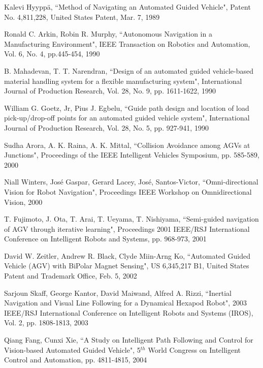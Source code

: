 \begin{thebibliography}{}
\small

 Kalevi Hyypp\"{a}, ``Method of Navigating an Automated Guided Vehicle", Patent No. 4,811,228, United States Patent, Mar. 7, 1989

 Ronald C. Arkin, Robin R. Murphy, ``Autonomous Navigation in a Manufacturing Environment", IEEE Transaction on Robotics and Automation, Vol. 6, No. 4, pp.445-454, 1990

 B. Mahadevan, T. T. Narendran, ``Design of an automated guided vehicle-based material handling system for a flexible manufacturing system", International Journal of Production Research, Vol. 28, No. 9, pp. 1611-1622, 1990

 William G. Goetz, Jr, Pius J. Egbelu, ``Guide path design and location of load pick-up/drop-off points for an automated guided vehicle system", International Journal of Production Research, Vol. 28, No. 5, pp. 927-941, 1990

 Sudha Arora, A. K. Raina, A. K. Mittal, ``Collision Avoidance among AGVs at Junctions", Proceedings of the IEEE Intelligent Vehicles Symposium, pp. 585-589, 2000

 Niall Winters, Jos\'{e} Gaspar, Gerard Lacey, Jos\'{e}, Santos-Victor, ``Omni-directional Vision for Robot Navigation", Proceedings IEEE Workshop on Omnidirectional Vision, 2000

 T. Fujimoto, J. Ota, T. Arai, T. Ueyama, T. Nishiyama, ``Semi-guided navigation of AGV through iterative learning", Proceedings 2001 IEEE/RSJ International Conference on Intelligent Robots and Systems, pp. 968-973, 2001

 David W. Zeitler, Andrew R. Black, Clyde Miin-Arng Ko, ``Automated Guided Vehicle (AGV) with BiPolar Magnet Sensing", US 6,345,217 B1, United States Patent and Trademark Office, Feb. 5, 2002

 Sarjoun Skaff, George Kantor, David Maiwand, Alfred A. Rizzi, ``Inertial Navigation and Visual Line Following for a Dynamical Hexapod Robot", 2003 IEEE/RSJ International Conference on Intelligent Robots and Systems (IROS), Vol. 2, pp. 1808-1813, 2003 

 Qiang Fang, Cunxi Xie, ``A Study on Intelligent Path Following and Control for Vision-based Automated Guided Vehicle", 5$^{th}$ World Congress on Intelligent Control and Automation, pp. 4811-4815, 2004



\end{thebibliography}
